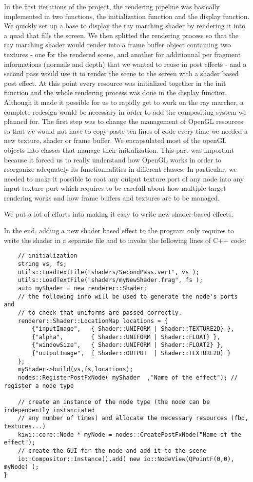 In the first iterations of the project, the rendering pipeline was basically implemented
in two functions, the initialization function and the display function. We quickly
set up a base to display the ray marching shader by rendering it into a quad that
fills the screen. We then splitted the rendering process so that the ray marching
shader would render into a frame buffer object containing two textures - one for
the rendered scene, and another for additionnal per fragment informations (normals and depth)
that we wanted to reuse in post effects - and a second pass would use it to render
the scene to the screen with a shader based post effect. At this point every
resource was initialized together in the init function and the whole rendering
process was done in the display function. Although it made it possible for us to
rapidly get to work on the ray marcher, a complete redesign would be necessary in
order to add the compositing system we planned for. The first step was to change
the management of OpenGL resources so that we would not have to copy-paste ten lines
of code every time we needed a new texture, shader or frame buffer. We encapsulated
most of the openGL objects into classes that manage their initialization. This part
was important because it forced us to really understand how OpenGL works in order
to reorganize adequately its functionnalities in different classes. In particular,
we needed to make it possible to root any output texture port of any node into any input
texture port which requires to be carefull about how multiple target rendering works
and how frame buffers and textures are to be managed.

We put a lot of efforts into making it easy to write new shader-based effects.

In the end, adding a new shader based effect to the program only requires to write
the shader in a separate file and to invoke the following lines of C++ code:
\begin{lstlisting}
    // initialization
    string vs, fs;
    utils::LoadTextFile("shaders/SecondPass.vert", vs );
    utils::LoadTextFile("shaders/myNewShader.frag", fs );
    auto myShader = new renderer::Shader;
    // the following info will be used to generate the node's ports and
    // to check that uniforms are passed correctly.
    renderer::Shader::LocationMap locations = {
        {"inputImage",   { Shader::UNIFORM | Shader::TEXTURE2D} },
        {"alpha",        { Shader::UNIFORM | Shader::FLOAT} },
        {"windowSize",   { Shader::UNIFORM | Shader::FLOAT2} },
        {"outputImage",  { Shader::OUTPUT  | Shader::TEXTURE2D} }
    };
    myShader->build(vs,fs,locations);
    nodes::RegisterPostFxNode( myShader  ,"Name of the effect"); // register a node type

    // create an instance of the node type (the node can be independently instanciated
    // any number of times) and allocate the necessary resources (fbo, textures...)
    kiwi::core::Node * myNode = nodes::CreatePostFxNode("Name of the effect");
    // create the GUI for the node and add it to the scene
    io::Compositor::Instance().add( new io::NodeView(QPointF(0,0), myNode) );
}
\end{lstlisting}

